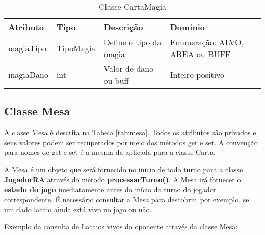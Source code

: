\documentclass[10pt]{article}
\begin{document}
\renewcommand{\arraystretch}{1.15}
\begin{table}[h]
\centering
\caption{Classe CartaMagia}
\label{tab:cartaMagia}
\begin{tabular}{|l|l|p{5cm}|p{4cm}|}
\hline
Atributo & Tipo & Descrição & Domínio \\ \hline
magiaTipo & TipoMagia & Define o tipo da magia & Enumeração: ALVO, AREA ou BUFF \\ \hline
magiaDano & int       & Valor de dano ou buff  & Inteiro positivo \\ \hline
\end{tabular}
\end{table}


%

\subsection{Classe Mesa}

A classe Mesa é descrita na Tabela \ref{tab:mesa}. Todos os atributos são privados e seus valores podem ser recuperados por meio dos métodos get e set. A convenção para nomes de get e set é a mesma da aplicada para a classe Carta.

A Mesa é um objeto que será fornecido no início de todo turno para a classe \textbf{JogadorRA} através do método \textbf{processarTurno()}. A Mesa irá fornecer o \textbf{estado do jogo} imediatamente antes do início do turno do jogador correspondente. É necessário consultar a Mesa para descobrir, por exemplo, se um dado lacaio ainda está vivo no jogo ou não.

Exemplo da consulta de Lacaios vivos do oponente através da classe Mesa:


\end{document}
